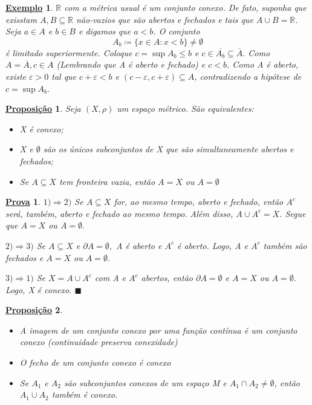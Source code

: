 \documentclass{article}
\newtheorem*{prop*}{\underline{Proposi\c c\~ao}}
\newtheorem{example}{\underline{Exemplo}}
\newtheorem*{proof*}{\underline{Prova}}
\renewcommand\qedsymbol{$\blacksquare$}
\begin{document}
 \begin{example}
   \(\mathbb{R}\) com a métrica usual é um conjunto conexo. De fato, suponha que exisstam
   \(A, B\subseteq{\mathbb{R}}\) não-vazios que são abertos e fechados e tais que \(A\cup B = \mathbb{R}\).
   Seja \(a\in A\) e \(b\in B\) e digamos que \(a < b\). O conjunto 
     \[
       A_{b}\coloneqq \{x\in A: x < b\}\neq\emptyset
     \]
  é limitado superiormente. Coloque \(c = \sup A_{b}\leq b\) e \(c\in \overline{A_{b}}\subseteq{\overline{A}}.\) 
Como \(A = \overline{A}, c\in A\) (Lembrando que A é aberto e fechado) e \(c < b\). Como A é
aberto, existe \(\varepsilon >0\) tal que \(c+\varepsilon < b\) e \((c-\varepsilon , c + \varepsilon )\subseteq{A}\),
contradizendo a hipótese de \(c = \sup A_{b}.\)
 \end{example}
\begin{prop*}
  Seja \((X, \rho )\) um espaço métrico. São equivalentes:
 \begin{itemize}
   \item[1)] X é conexo;
   \item[2)] X e \(\emptyset\) são os únicos subconjuntos de X que são simultaneamente
abertos e fechados;
   \item[3)] Se \(A\subseteq X\) tem fronteira vazia, então \(A = X\) ou \(A = \emptyset\)
 \end{itemize}
\end{prop*}
\begin{proof*}
  \(1) \Rightarrow 2)\) Se \(A \subseteq{X}\) for, ao mesmo tempo, aberto e fechado,
então \(A^{c}\) será, também, aberto e fechado ao mesmo tempo. Além disso, \(A\cup A^{c} = X\).
Segue que \(A = X\) ou \(A = \emptyset.\)

  \(2) \Rightarrow 3)\) Se \(A\subseteq{X}\) e \(\partial A = \emptyset,\) A é aberto e \(A^{c}\) é 
  aberto. Logo, A e \(A^{c}\) também são fechados e \(A=X\) ou \(A=\emptyset\).

  \(3) \Rightarrow 1)\) Se \(X = A\cup A^{c}\) com A e \(A^{c}\) abertos, então \(\partial A = \emptyset\) e \(A = X\)
ou \(A = \emptyset.\) Logo, X é conexo. \qedsymbol
\end{proof*}
 \begin{prop*}
  \begin{itemize}
    \item[1)] A imagem de um conjunto conexo por uma função contínua é um conjunto conexo (continuidade preserva conexidade)
    \item[2)] O fecho de um conjunto conexo é conexo
    \item[3)] Se \(A_{1}\) e \(A_{2}\) são subconjuntos conexos de um espaço M e 
  \(A_{1}\cap A_{2}\neq\emptyset\), então \(A_{1}\cup A_{2}\) também é conexo.
  \end{itemize}
 \end{prop*}
\end{document}
